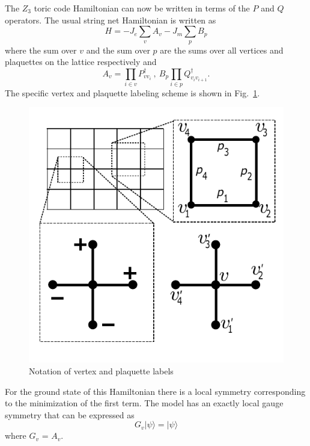 \documentclass[aps,floatfix,11pt,twocolumn]{revtex4-1}
\begin{document}
        The $Z_3$ toric code Hamiltonian can now be written in terms of the $P$ and $Q$ operators. The
        usual string net Hamiltonian is written as 
        \begin{equation}
            H = - J_e \sum_v A_v - J_m \sum_p B_p
        \end{equation}
        where the sum over $v$ and the sum over $p$ are the sums over all vertices and plaquettes on
        the lattice respectively and 
        \begin{equation}
            A_v = \prod_{i\in v} P^\dagger_{vv_i}~,~ B_p \prod_{i\in p} Q^\dagger_{v_iv_{i+1}}
            .
        \end{equation}
        The specific vertex and plaquette labeling scheme is shown in Fig.~\ref{fig:vertex_link_labels}.
        \begin{figure}[htpb]
            \centering
            \includegraphics[width=0.8\linewidth]{vertex_link_gauge_def}
            \caption{Notation of vertex and plaquette labels}
            \label{fig:vertex_link_labels}
        \end{figure}
        For the ground state of this Hamiltonian there is a local symmetry corresponding to the
        minimization of the first term. The model has an exactly local gauge symmetry that can be
        expressed as
        \begin{equation}
            G_v | \psi \rangle= | \psi \rangle
        \end{equation}
        where $G_v$ = $A_v$.
\end{document}
